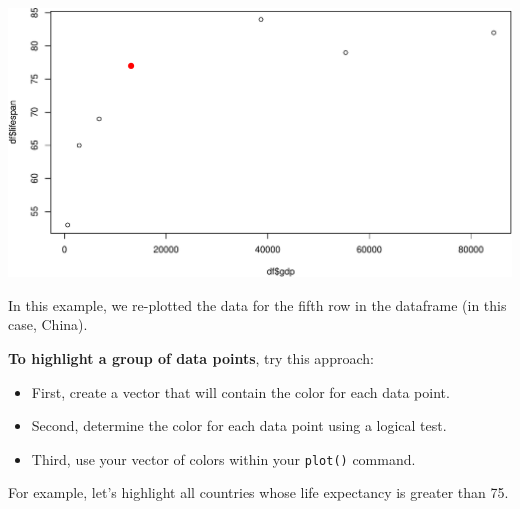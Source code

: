 \documentclass[]{book}
\newenvironment{Shaded}{\begin{snugshade}}{\end{snugshade}}
\newcommand{\DataTypeTok}[1]{\textcolor[rgb]{0.13,0.29,0.53}{#1}}
\newcommand{\DecValTok}[1]{\textcolor[rgb]{0.00,0.00,0.81}{#1}}
\newcommand{\FloatTok}[1]{\textcolor[rgb]{0.00,0.00,0.81}{#1}}
\newcommand{\KeywordTok}[1]{\textcolor[rgb]{0.13,0.29,0.53}{\textbf{#1}}}
\newcommand{\NormalTok}[1]{#1}
\newcommand{\OperatorTok}[1]{\textcolor[rgb]{0.81,0.36,0.00}{\textbf{#1}}}
\newcommand{\StringTok}[1]{\textcolor[rgb]{0.31,0.60,0.02}{#1}}
\begin{document}
\begin{Shaded}
\end{Shaded}

\includegraphics{figures/unnamed-chunk-617-1.pdf}

In this example, we re-plotted the data for the fifth row in the dataframe (in this case, China).

\textbf{To highlight a group of data points}, try this approach:

\begin{itemize}
\item
  First, create a vector that will contain the color for each data point.
\item
  Second, determine the color for each data point using a logical test.
\item
  Third, use your vector of colors within your \texttt{plot()} command.
\end{itemize}

For example, let's highlight all countries whose life expectancy is greater than 75.
\end{document}
